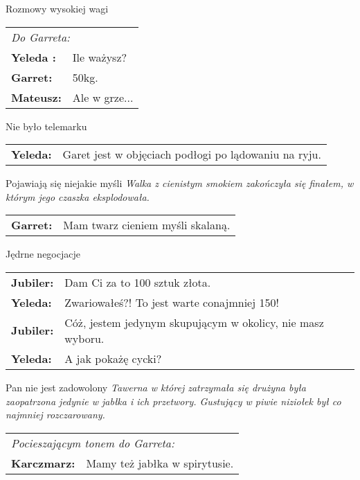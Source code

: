 \documentclass[10pt,twoside,twocolumn]{book}
\begin{document}
\begin{rpg-quotebox}{Rozmowy wysokiej wagi}
   \begin{tabularx}{\columnwidth}{lX}
      \multicolumn{2}{l}{\textit{Do Garreta:}}\\
      \textbf{Yeleda :} & Ile ważysz? \\
      \textbf{Garret:} & 50kg.\\
      \textbf{Mateusz:} & Ale w grze...\\
   \end{tabularx}
\end{rpg-quotebox}


\begin{rpg-quotebox}{Nie było telemarku}
   \begin{tabularx}{\columnwidth}{lX}
      \textbf{Yeleda:} & Garet jest w objęciach podłogi po lądowaniu na ryju.
   \end{tabularx}
\end{rpg-quotebox}


\begin{rpg-quotebox}{Pojawiają się niejakie myśli}
   \textit{Walka z cienistym smokiem zakończyła się finałem, w którym jego czaszka eksplodowała.}\\
   
   \begin{tabularx}{\columnwidth}{lX}
      \textbf{Garret:} & Mam twarz cieniem myśli skalaną.\\
   \end{tabularx}
\end{rpg-quotebox}


\begin{rpg-quotebox}{Jędrne negocjacje}
   \begin{tabularx}{\columnwidth}{lX}
      \textbf{Jubiler:} & Dam Ci za to 100 sztuk złota. \\
      \textbf{Yeleda:} & Zwariowałeś?! To jest warte conajmniej 150!\\
      \textbf{Jubiler:} & Cóż, jestem jedynym skupującym w okolicy, nie masz wyboru.\\
      \textbf{Yeleda:} & A jak pokażę cycki?
   \end{tabularx}
\end{rpg-quotebox}
    

\begin{rpg-quotebox}{Pan nie jest zadowolony}
   \textit{Tawerna w której zatrzymała się drużyna była zaopatrzona jedynie w jabłka i ich przetwory. Gustujący w piwie niziołek był co najmniej rozczarowany.}\\
   
   \begin{tabularx}{\columnwidth}{lX}
      \multicolumn{2}{l}{\textit{Pocieszającym tonem do Garreta:}}\\
      
      \textbf{Karczmarz:} & Mamy też jabłka w spirytusie.\\
   \end{tabularx}
\end{rpg-quotebox}
\end{document}
